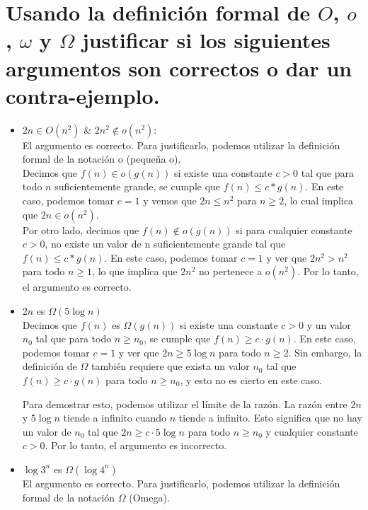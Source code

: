 \section{Usando la definición formal de $O$, $o$, $\omega$ y $\Omega$ justificar si los siguientes argumentos son correctos o dar un contra-ejemplo.}

\begin{itemize}
	\item $2n \in O(n^2)$ \&  $2n^2 \notin o(n^2)$:\\
	      El argumento es correcto. Para justificarlo,
	      podemos utilizar la definición formal de la notación o (pequeña o). \\

	      Decimos que $f(n) \in o(g(n))$ si existe una constante $c > 0$ tal que para todo $n$ suficientemente grande, se cumple que $f(n) \leq c*g(n)$.
	      En este caso, podemos tomar $c=1$ y vemos que $2n \leq n^2$ para $n \geq 2$, lo cual implica que $2n \in o(n^2)$.\\

	      Por otro lado, decimos que $f(n) \notin o(g(n))$ si para cualquier constante $c > 0$,
	      no existe un valor de n suficientemente grande tal que $f(n) \leq c * g(n)$.
	      En este caso, podemos tomar $c = 1$ y ver que $2n^2 > n^2$ para todo $n \geq 1$,
	      lo que implica que $2n^2$ no pertenece a $o(n^2)$. Por lo tanto, el argumento es correcto.
	\item $2n$ es $\Omega (5 \log n )$\\
	      Decimos que $f(n)$ es $\Omega(g(n))$ si existe una constante $c > 0$ y un valor $n_0$ tal que para todo $n \geq n_0$,
	      se cumple que $f(n) \geq c \cdot g(n)$. En este caso, podemos tomar $c = 1$ y ver que $2n \geq 5 \log n$ para todo
	      $n \geq 2$. Sin embargo, la definición de $\Omega$ también requiere que exista un valor $n_0$ tal que $f(n) \geq c \cdot g(n)$
	      para todo $n \geq n_0$, y esto no es cierto en este caso.

	      Para demostrar esto, podemos utilizar el límite de la razón. La razón entre $2n$ y $5 \log n$ tiende a infinito cuando $n$ tiende a infinito.
	      Esto significa que no hay un valor de $n_0$ tal que $2n \geq c \cdot 5 \log n$ para todo $n \geq n_0$ y cualquier constante $c > 0$.
	      Por lo tanto, el argumento es incorrecto.
	\item $\log 3^n$ es $\Omega (\log 4^n)$\\
	      El argumento es correcto. Para justificarlo, podemos utilizar la definición formal de la notación $\Omega$ (Omega).


\end{itemize}
